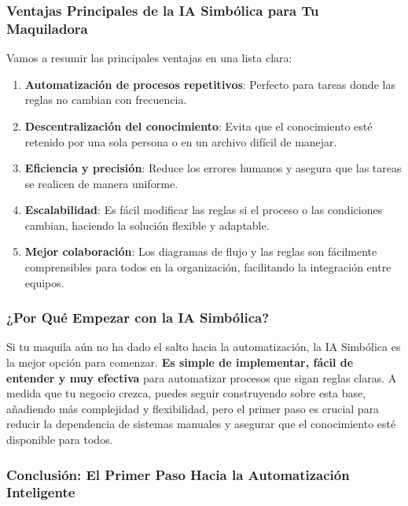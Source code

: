 \documentclass[
  10pt,
  letterpaper,
]{book}
\providecommand{\tightlist}{%
  \setlength{\itemsep}{0pt}\setlength{\parskip}{0pt}}\usepackage{longtable,booktabs,array}
\begin{document}
\subsubsection{Ventajas Principales de la IA Simbólica para Tu
Maquiladora}\label{ventajas-principales-de-la-ia-simbuxf3lica-para-tu-maquiladora}

Vamos a resumir las principales ventajas en una lista clara:

\begin{enumerate}
\def\labelenumi{\arabic{enumi}.}
\tightlist
\item
  \textbf{Automatización de procesos repetitivos}: Perfecto para tareas
  donde las reglas no cambian con frecuencia.
\item
  \textbf{Descentralización del conocimiento}: Evita que el conocimiento
  esté retenido por una sola persona o en un archivo difícil de manejar.
\item
  \textbf{Eficiencia y precisión}: Reduce los errores humanos y asegura
  que las tareas se realicen de manera uniforme.
\item
  \textbf{Escalabilidad}: Es fácil modificar las reglas si el proceso o
  las condiciones cambian, haciendo la solución flexible y adaptable.
\item
  \textbf{Mejor colaboración}: Los diagramas de flujo y las reglas son
  fácilmente comprensibles para todos en la organización, facilitando la
  integración entre equipos.
\end{enumerate}

\subsubsection{¿Por Qué Empezar con la IA
Simbólica?}\label{por-quuxe9-empezar-con-la-ia-simbuxf3lica}

Si tu maquila aún no ha dado el salto hacia la automatización, la IA
Simbólica es la mejor opción para comenzar. \textbf{Es simple de
implementar, fácil de entender y muy efectiva} para automatizar procesos
que sigan reglas claras. A medida que tu negocio crezca, puedes seguir
construyendo sobre esta base, añadiendo más complejidad y flexibilidad,
pero el primer paso es crucial para reducir la dependencia de sistemas
manuales y asegurar que el conocimiento esté disponible para todos.

\subsubsection{Conclusión: El Primer Paso Hacia la Automatización
Inteligente}\label{conclusiuxf3n-el-primer-paso-hacia-la-automatizaciuxf3n-inteligente}
\end{document}

